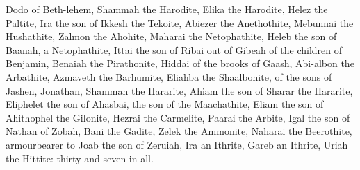 {Dodo of
Beth-lehem,
Shammah the
Harodite,
Elika the
Harodite,
Helez the
Paltite,
Ira the
son of
Ikkesh the
Tekoite,
Abiezer the
Anethothite,
Mebunnai the
Hushathite,
Zalmon the
Ahohite,
Maharai the
Netophathite,
Heleb the
son of
Baanah, a
Netophathite,
Ittai the
son of
Ribai out of
Gibeah of the
children of
Benjamin,
Benaiah the
Pirathonite,
Hiddai of the
brooks of
Gaash,
Abi-albon the
Arbathite,
Azmaveth the
Barhumite,
Eliahba the
Shaalbonite, of the
sons of
Jashen,
Jonathan,
Shammah the
Hararite,
Ahiam the
son of
Sharar the
Hararite,
Eliphelet the
son of
Ahasbai, the
son of the
Maachathite,
Eliam the
son of
Ahithophel the
Gilonite,
Hezrai the
Carmelite,
Paarai the
Arbite,
Igal the
son of
Nathan of
Zobah,
Bani the
Gadite,
Zelek the
Ammonite,
Naharai the
Beerothite,
armourbearer to
Joab the
son of
Zeruiah,
Ira an
Ithrite,
Gareb an
Ithrite,
Uriah the
Hittite:
thirty and
seven in all.

}
